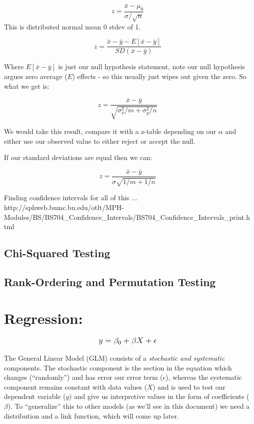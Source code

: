 \documentclass[12pt]{article}\usepackage[]{graphicx}\usepackage[]{color}
\begin{document}
\begin{flushleft}
$$ z = \frac{\bar{x} - \mu_0}{\sigma / \sqrt{n}} $$ This is distributed normal mean 0 stdev of 1.


$$ z = \frac{ \bar{x} - \bar{y} - E[\bar{x}-\bar{y}]}{SD(\bar{x}-\bar{y})} $$

Where $E[\bar{x}-\bar{y}]$ is just our null hypothesis statement, note our null hypothesis argues zero average ($E$) effects - so this usually just wipes out given the zero. So what we get is:

$$ z = \frac{\bar{x}-\bar{y} }{\sqrt{\sigma_x^2/m  + \sigma_y^2/n}} $$

We would take this result, compare it with a z-table depending on our $\alpha$ and either use our observed value to either reject or accept the null.

If our standard deviations are equal then we can:

$$ z = \frac{\bar{x}-\bar{y} }{\sigma \sqrt{1/m  + 1/n}} $$

Finding confidence intervals for all of this ...
http://sphweb.bumc.bu.edu/otlt/MPH-Modules/BS/BS704_Confidence_Intervals/BS704_Confidence_Intervals_print.html

\subsection{Chi-Squared Testing}


\subsection{Rank-Ordering and Permutation Testing}









\clearpage
\section{Regression:}

\begin{equation}
\mathlarger{ y = \beta_0 + \beta X + \epsilon }
\end{equation}

The General Linear Model (GLM) consists of a \textit{stochastic and systematic} components. The stochastic component is the section in the equation which changes (``randomly'') and has error our error term ($\epsilon$), whereas the systematic component remains constant with data values ($X$) and is used to test our dependent variable ($y$) and give us interpretive values in the form of coefficients ($\beta$). To ``generalize'' this to other models (as we'll see in this document) we need a distribution and a link function, which will come up later.


\end{flushleft}
\end{document}

